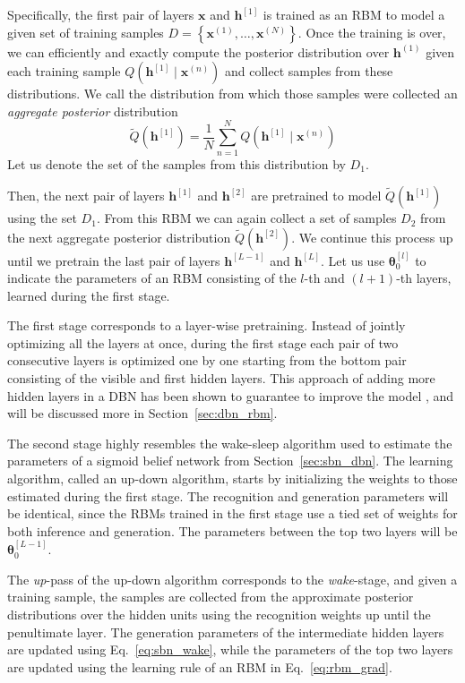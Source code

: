 \documentclass[dissertation,nocontribution,draft*]{aaltoseries}
\newcommand{\qlay}[1]{\left[#1\right]}
\newcommand{\vect}[1]{\mathbf{#1}}
\newcommand{\vects}[1]{\boldsymbol{#1}}
\newcommand{\vh}[0]{\vect{h}}
\newcommand{\vx}[0]{\vect{x}}
\newcommand{\TT}[0]{{\vects{\theta}}}
\begin{document}
Specifically, the first pair of layers $\vx$ and
$\vh^{\qlay{1}}$
is trained as an RBM to model a given set of training
samples $D=\left\{ \vx^{(1)}, \dots, \vx^{(N)} \right\}$.
Once the training is over, we can efficiently and exactly
compute the posterior distribution over $\vh^{(1)}$ given
each training sample $Q(\vh^{\qlay{1}} \mid \vx^{(n)})$ and
collect samples from these distributions. We call the
distribution from which those samples were collected an
\textit{aggregate posterior} distribution
\[
\tilde{Q}\left( \vh^{\qlay{1}} \right) = \frac{1}{N}
\sum_{n=1}^N Q\left(\vh^{\qlay{1}} \mid \vx^{(n)}\right)
\]
Let us denote the set of the samples from this distribution by $D_1$. 

Then, the next pair of layers $\vh^{\qlay{1}}$ and
$\vh^{\qlay{2}}$ are pretrained to model $\tilde{Q}\left(
\vh^{\qlay{1}} \right)$ using the set $D_1$. From this RBM
we can again collect a set of samples $D_2$ from the next
aggregate posterior distribution $\tilde{Q}\left(
\vh^{\qlay{2}} \right)$. We continue this process up until
we pretrain the last pair of layers $\vh^{\qlay{L-1}}$ and
$\vh^{\qlay{L}}$. Let us use $\TT_0^{\qlay{l}}$ to indicate the
parameters of an RBM consisting of the $l$-th and $(l+1)$-th
layers, learned during the first stage.

The first stage corresponds to a layer-wise
pretraining. Instead of jointly optimizing all the layers at
once, during the first stage each pair of two consecutive
layers is optimized one by one starting from the bottom pair
consisting of the visible and first hidden layers. This
approach of adding more hidden layers in a DBN has been
shown to guarantee to improve the model
\citep{Hinton2006nc}, and will be discussed more in
Section~\ref{sec:dbn_rbm}.

The second stage highly resembles the wake-sleep algorithm
used to estimate the parameters of a sigmoid belief network
from Section~\ref{sec:sbn_dbn}. The learning algorithm,
called an up-down algorithm, starts by initializing the
weights to those estimated during the first stage. The
recognition and generation parameters will be identical,
since the RBMs trained in the first stage use a tied set of
weights for both inference and generation. The parameters
between the top two layers will be $\TT_0^{\qlay{L-1}}$.

The \textit{up}-pass of the up-down algorithm corresponds to
the \textit{wake}-stage, and given a training sample, the
samples are collected from the approximate posterior
distributions over the hidden units using the recognition
weights up until the penultimate layer. The generation
parameters of the intermediate hidden layers are updated
using Eq.~\eqref{eq:sbn_wake}, while the parameters of the
top two layers are updated using the learning rule of an RBM
in Eq.~\eqref{eq:rbm_grad}.
\end{document}
